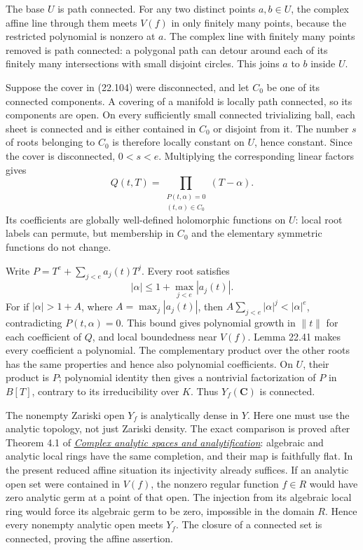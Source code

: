 \documentclass[
  11pt,
  a4paper,
]{article}
\newcounter{none} %
\begin{document}
The base \(U\) is path connected. For any two distinct points
\(a,b\in U\), the complex affine line through them meets \(V(f)\) in
only finitely many points, because the restricted polynomial is nonzero
at \(a\). The complex line with finitely many points removed is path
connected: a polygonal path can detour around each of its finitely many
intersections with small disjoint circles. This joins \(a\) to \(b\)
inside \(U\).

Suppose the cover in (22.104) were disconnected, and let \(C_0\) be one
of its connected components. A covering of a manifold is locally path
connected, so its components are open. On every sufficiently small
connected trivializing ball, each sheet is connected and is either
contained in \(C_0\) or disjoint from it. The number \(s\) of roots
belonging to \(C_0\) is therefore locally constant on \(U\), hence
constant. Since the cover is disconnected, \(0<s<e\). Multiplying the
corresponding linear factors gives \[
 Q(t,T)=\prod_{\substack{P(t,\alpha)=0\\(t,\alpha)\in C_0}}(T-\alpha).
 \tag{22.105}
\] Its coefficients are globally well-defined holomorphic functions on
\(U\): local root labels can permute, but membership in \(C_0\) and the
elementary symmetric functions do not change.

Write \(P=T^e+\sum_{j<e}a_j(t)T^j\). Every root satisfies \[
 |\alpha|\le 1+\max_{j<e}|a_j(t)|.
 \tag{22.106}
\] For if \(|\alpha|>1+A\), where \(A=\max_j|a_j(t)|\), then
\(A\sum_{j<e}|\alpha|^j<|\alpha|^e\), contradicting \(P(t,\alpha)=0\).
This bound gives polynomial growth in \(\|t\|\) for each coefficient of
\(Q\), and local boundedness near \(V(f)\). Lemma 22.41 makes every
coefficient a polynomial. The complementary product over the other roots
has the same properties and hence also polynomial coefficients. On
\(U\), their product is \(P\); polynomial identity then gives a
nontrivial factorization of \(P\) in \(B[T]\), contrary to its
irreducibility over \(K\). Thus \(Y_f(\mathbf C)\) is connected.

The nonempty Zariski open \(Y_f\) is analytically dense in \(Y\). Here
one must use the analytic topology, not just Zariski density. The exact
comparison is proved after Theorem 4.1 of
\href{https://kokunoyumeto.github.io/open-math-courses-public/courses/AG-QC/complex-analytic-spaces-and-analytification.html\#4-the-comparison-at-a-point}{\emph{Complex
analytic spaces and analytification}}: algebraic and analytic local
rings have the same completion, and their map is faithfully flat. In the
present reduced affine situation its injectivity already suffices. If an
analytic open set were contained in \(V(f)\), the nonzero regular
function \(f\in R\) would have zero analytic germ at a point of that
open. The injection from its algebraic local ring would force its
algebraic germ to be zero, impossible in the domain \(R\). Hence every
nonempty analytic open meets \(Y_f\). The closure of a connected set is
connected, proving the affine assertion.
\end{document}
